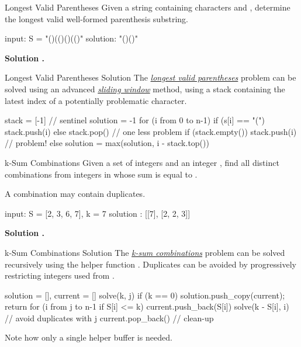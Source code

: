 \documentclass{cognito}
\begin{document}
\begin{note}{Longest Valid Parentheses}
	Given a string  containing characters \incode{(} and \incode{)}, determine the longest
	valid well-formed parenthesis substring.
	
	\begin{largecode}
 input: S = "()(()()(()"
 solution:     "()()"
	\end{largecode}
	\bf Solution \hyperref[note:Longest Valid Parentheses Solution]{\solutionref}.
\end{note}

\begin{note}{Longest Valid Parentheses Solution}
	The \hyperref[note:Longest Valid Parentheses]{\it longest valid parentheses} problem can be solved using
	an advanced \hyperref[note:Sliding Window Method]{\it sliding window} method, using a stack
	containing the latest index of a potentially problematic character.
	
	\begin{largecode}
 stack = [-1]  // sentinel
 solution = -1
 for (i from 0 to n-1)
 	if (s[i] == "(") stack.push(i)
	else
		stack.pop()   // one less problem
		if (stack.empty()) stack.push(i) // problem!
		else solution = max(solution, i - stack.top())
	\end{largecode}
\end{note}

\begin{note}{k-Sum Combinations}
	Given a set of integers  and an integer ,
	find all distinct combinations from integers in  whose sum is equal to .
	\begin{remark} A combination may contain duplicates. \end{remark}
	\begin{largecode}
 input: S = [2, 3, 6, 7], k = 7
 solution : [[7], [2, 2, 3]]
	\end{largecode}
	\bf Solution \hyperref[note:k-Sum Combinations Solution]{\solutionref}.
\end{note}

\begin{note}{k-Sum Combinations Solution}
	The \hyperref[note:k-Sum Combinations]{\it k-sum combinations} problem can be solved recursively
	using the helper function .
	Duplicates can be avoided by progressively restricting integers used from .
	
	\begin{largecode}
 solution = [], current = []
 solve(k, j)
 	if (k == 0) { solution.push_copy(current); return }
	for (i from j to n-1 if S[i] <= k)
		current.push_back(S[i])
		solve(k - S[i], i)   // avoid duplicates with j
		current.pop_back()   // clean-up
	\end{largecode}
	\begin{remark} Note how only a single helper buffer  is needed. \end{remark}
	\vspace{-5pt}
\end{note}
\end{document}
